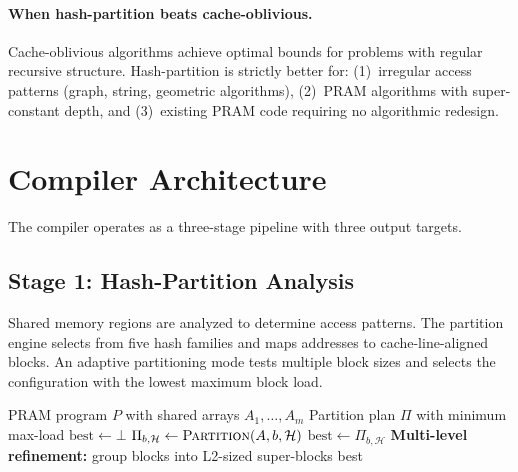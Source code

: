 \documentclass[11pt]{article}
\begin{document}
\paragraph{When hash-partition beats cache-oblivious.}
Cache-oblivious algorithms achieve optimal bounds for problems with
regular recursive structure.  Hash-partition is strictly better for:
(1)~irregular access patterns (graph, string, geometric algorithms),
(2)~PRAM algorithms with super-constant depth, and
(3)~existing PRAM code requiring no algorithmic redesign.

\section{Compiler Architecture}
\label{sec:compiler}

The compiler operates as a three-stage pipeline with three output targets.

\subsection{Stage 1: Hash-Partition Analysis}

Shared memory regions are analyzed to determine access patterns.
The partition engine selects from five hash families and maps addresses
to cache-line-aligned blocks.  An adaptive partitioning mode tests
multiple block sizes and selects the configuration with the lowest
maximum block load.

\begin{algorithm}[t]
\caption{Hash-Partition Analysis with Adaptive Block Sizing}
\begin{algorithmic}[1]
\Require PRAM program $P$ with shared arrays $A_1, \ldots, A_m$
\Ensure Partition plan $\Pi$ with minimum max-load
\State $\text{best} \gets \bot$
    \State $\Pi_{b,\mathcal{H}} \gets \textsc{Partition}(A, b, \mathcal{H})$
      \State $\text{best} \gets \Pi_{b,\mathcal{H}}$
    \EndIf
  \EndFor
\EndFor
\State \textbf{Multi-level refinement:} group blocks into L2-sized super-blocks
\State \Return best
\end{algorithmic}
\end{algorithm}
\end{document}
